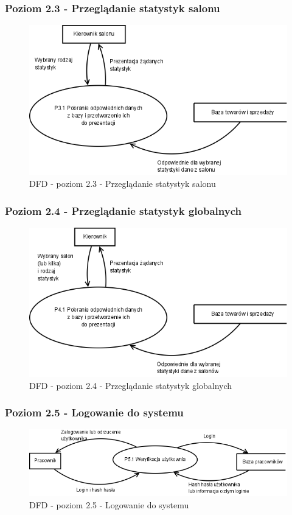 \subsubsection{Poziom 2.3 - Przeglądanie statystyk salonu}
\begin{figure}[h]
\includegraphics[width=1\textwidth]{gfx/dfd-2-3.png}
\caption{DFD - poziom 2.3 - Przeglądanie statystyk salonu}
\end{figure}
\clearpage
\subsubsection{Poziom 2.4 - Przeglądanie statystyk globalnych}
\begin{figure}[h]
\includegraphics[width=1\textwidth]{gfx/dfd-2-4.png}
\caption{DFD - poziom 2.4 - Przeglądanie statystyk globalnych}
\end{figure}
\clearpage
\subsubsection{Poziom 2.5 - Logowanie do systemu}
\begin{figure}[h]
\includegraphics[width=1\textwidth]{gfx/dfd-2-5.png}
\caption{DFD - poziom 2.5 - Logowanie do systemu}
\end{figure}
\clearpage
